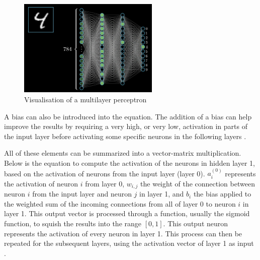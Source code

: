 \documentclass[12pt,a4paper,notitlepage]{article}
\begin{document}
\begin{figure}[htbp]
	\centering
		\includegraphics[width=0.60\textwidth]{images/perceptron-visualisation.png}
	\caption{Visualisation of a multilayer perceptron \cite{sanderson_gradient_2017}}
	\label{fig:perceptron-visualisation}
\end{figure}

A bias can also be introduced into the equation. The addition of a bias can help improve the results by requiring a very high, or very low, activation in parts of the input layer before activating some specific neurons in the following layers \cite{sanderson_but_2017}.

All of these elements can be summarized into a vector-matrix multiplication. Below is the equation to compute the activation of the neurons in hidden layer 1, based on the activation of neurons from the input layer (layer 0). \(a_i^{(0)}\) represents the activation of neuron \(i\) from layer 0, \(w_{i,j}\) the weight of the connection between neuron \(i\) from the input layer and neuron \(j\) in layer 1, and \(b_i\) the bias applied to the weighted sum of the incoming connections from all of layer 0 to neuron \(i\) in layer 1. This output vector is processed through a function, usually the sigmoid function, to squish the results into the range \([0,1]\). This output neuron represents the activation of every neuron in layer 1. This process can then be repeated for the subsequent layers, using the activation vector of layer 1 as input \cite{sanderson_but_2017}.
\end{document}
